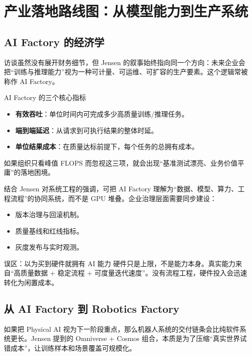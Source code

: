 \section{产业落地路线图：从模型能力到生产系统}

\subsection{AI Factory 的经济学}

访谈虽然没有展开财务细节，但 Jensen 的叙事始终指向同一个方向：未来企业会把“训练与推理能力”视为一种可计量、可运维、可扩容的生产要素。这个逻辑常被称作 AI Factory。

\begin{knowledgebox}{AI Factory 的三个核心指标}
\begin{itemize}
    \item \textbf{有效吞吐}：单位时间内可完成多少高质量训练/推理任务。
    \item \textbf{端到端延迟}：从请求到可执行结果的整体时延。
    \item \textbf{单位结果成本}：在质量达标前提下，每个任务的总拥有成本。
\end{itemize}
如果组织只看峰值 FLOPS 而忽视这三项，就会出现“基准测试漂亮、业务价值平庸”的落地困境。
\end{knowledgebox}

结合 Jensen 对系统工程的强调，可把 AI Factory 理解为“数据、模型、算力、工程流程”的协同系统，而不是 GPU 堆叠。企业治理层面需要同步建设：
\begin{itemize}
    \item 版本治理与回滚机制。
    \item 质量基线和红线指标。
    \item 灰度发布与实时观测。
\end{itemize}

\begin{warningbox}{误区：以为买到硬件就拥有 AI 能力}
硬件只是上限，不是能力本身。真实能力来自“高质量数据 + 稳定流程 + 可度量迭代速度”。没有流程工程，硬件投入会迅速转化为闲置成本。
\end{warningbox}

\subsection{从 AI Factory 到 Robotics Factory}

如果把 Physical AI 视为下一阶段重点，那么机器人系统的交付链条会比纯软件系统更长。Jensen 提到的 Omniverse + Cosmos 组合，本质是为了压缩“真实世界试错成本”，让训练样本和场景覆盖可规模化。

